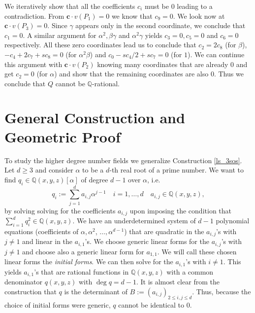 \documentclass[a4paper,11pt]{amsart}%
\newcommand{\comment}[1]{}
\newcommand\Q{\mathbb{Q}}
\theoremstyle{definition}
\begin{document}
We iteratively show that all the coefficients $c_i$ must be $0$ leading to a contradiction. From $\bm{c}\cdot v(P_1) = 0$ we know that $c_9=0$. We look now at $\bm{c}\cdot v(P_3) = 0$.
Since $\gamma$ appears only in the second coordinate, we conclude that $c_1=0$. A similar argument for $\alpha^2,\beta\gamma$ and $\alpha^2\gamma$ yields $c_3=0,c_5=0$ and $c_6=0$ respectively.
All these zero coordinates lead us to conclude that $c_2=2c_8$ (for $\beta$), $-c_4+2c_7+sc_8=0$ (for $\alpha^2\beta$) and $c_0-sc_4/2+sc_7=0$ (for $1$). We can continue this argument with 
$\bm{c}\cdot v(P_2)$ knowing many coordinates that are already $0$ and get
$c_2=0$ (for $\alpha$) and show that the remaining coordinates are also $0$. Thus we conclude that $Q$ cannot be $\Q$-rational.
\comment{
We iteratively show that all the coefficients $c_i$ must be $0$ leading to a contradiction. From $\bm{c} . v(P_1) = 0$ we know that $c_7=0$. We look now at $\bm{c} . v(P_3) = 0$.
Since $\alpha^2\gamma$ appears only in the third coordinate, we conclude that $c_2=0$. A similar argument for $\alpha^2,\alpha\gamma$ and $\beta$ yields $c_9=0,c_3=0$ and $c_5=0$ respectively.
All these zero coordinates lead us to conclude that $c_0=2c_4$ (for $\beta\alpha^2$) and $2(c_8-c_4)+c_6=0$ (for $\alpha\beta$). We can continue this argument with $\bm{c} . v(P_2)$ knowing many 
coordinates that are already $0$ and get
$c_6=0$ and $c_4=2c_8$ and finally conclude that $Q$ cannot be $\Q$-rational.
}

\section{General Construction and Geometric Proof}

To study the higher degree number fields we generalize Construction \ref{ls_3sos}. Let $d\ge 3$ and consider $\alpha$ to be 
a $d$-th real root of a prime number. We want to find $q_i\in\Q(x,y,z)[\alpha]$ of degree $d-1$ over $\alpha$,  i.e.
$$q_i := \sum_{j=1}^d a_{i,j} \alpha^{j-1} \quad i=1,\dots,d \quad a_{i,j} \in \Q(x,y,z),$$
by solving solving for the coefficients $a_{i,j}$ upon imposing the condition that 
$\sum_{i=1}^d q_i^2 \in \Q(x,y,z)$. We have an underdetermined system of $d-1$ polynomial equations (coefficients of $\alpha,\alpha^2$, $\dots, 
\alpha^{d-1}$) that are quadratic in the $a_{i,j}$'s with $j\ne 1$ and linear in the $a_{i,1}$'s. We choose generic linear forms for the $a_{i,j}$'s with 
$j\ne 1$ and choose also a generic linear form for $a_{1,1}$. We will call these chosen linear forms the {\it initial forms}. We can then solve 
for the $a_{i,1}$'s 
with $i\ne 1$. This yields $a_{i,1}$'s that are 
rational functions in $\Q(x,y,z)$ with a common denominator $q(x,y,z)$ with $\deg q=d-1$. It is almost clear from the construction that $q$ is the determinant of 
$B:=(a_{i,j})_{2\le i,j \le d}$.
Thus, because the choice of initial forms were generic, $q$ cannot be identical to $0$.
\end{document}
